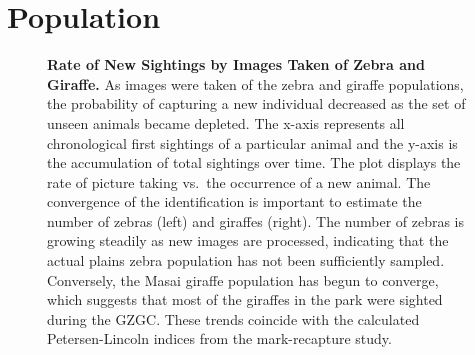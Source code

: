 \section{Population}

\begin{figure}[!htb]%
    \centering
        \caption[Rate of New Sightings by Images Taken of Zebra and Giraffe]{\textbf{Rate of New Sightings by Images Taken of Zebra and Giraffe.}  As images were taken of the zebra and giraffe populations, the probability of capturing a new individual decreased as the set of unseen animals became depleted.  The x-axis represents all chronological first sightings of a particular animal and the y-axis is the accumulation of total sightings over time.  The plot displays the rate of picture taking vs.\ the occurrence of a new animal.  The convergence of the identification is important to estimate the number of zebras (left) and giraffes (right).   The number of zebras is growing steadily as new images are processed, indicating that the actual plains zebra population has not been sufficiently sampled.  Conversely, the Masai giraffe population has begun to converge, which suggests that most of the giraffes in the park were sighted during the GZGC.  These trends coincide with the calculated Petersen-Lincoln indices from the mark-recapture study.}
        \label{fig:convergence}
\end{figure}

